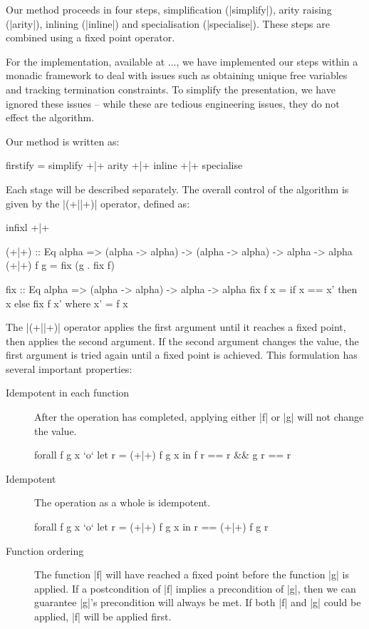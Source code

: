\documentclass[preprint]{sigplanconf}
\begin{document}
Our method proceeds in four steps, simplification (|simplify|), arity raising (|arity|), inlining (|inline|) and specialisation (|specialise|). These steps are combined using a fixed point operator.

For the implementation, available at ..., we have implemented our steps within a monadic framework to deal with issues such as obtaining unique free variables and tracking termination constraints. To simplify the presentation, we have ignored these issues -- while these are tedious engineering issues, they do not effect the algorithm.

Our method is written as:

\begin{code}
firstify = simplify +|+ arity +|+ inline +|+ specialise
\end{code}

Each stage will be described separately. The overall control of the algorithm is given by the |(+||+)| operator, defined as:

\begin{code}
infixl +|+

(+|+) :: Eq alpha => (alpha -> alpha) -> (alpha -> alpha) -> alpha -> alpha
(+|+) f g = fix (g . fix f)

fix :: Eq alpha => (alpha -> alpha) -> alpha -> alpha
fix f x = if x == x' then x else fix f x'
    where x' = f x
\end{code}

The |(+||+)| operator applies the first argument until it reaches a fixed point, then applies the second argument. If the second argument changes the value, the first argument is tried again until a fixed point is achieved. This formulation has several important properties:

\begin{description}
\item[Idempotent in each function] After the operation has completed, applying either |f| or |g| will not change the value.

\begin{code}
forall f g x `o` let r = (+|+) f g x in f r == r && g r == r
\end{code}

\item[Idempotent] The operation as a whole is idempotent.

\begin{code}
forall f g x `o` let r = (+|+) f g x in r == (+|+) f g r
\end{code}

\item[Function ordering] The function |f| will have reached a fixed point before the function |g| is applied. If a postcondition of |f| implies a precondition of |g|, then we can guarantee |g|'s precondition will always be met. If both |f| and |g| could be applied, |f| will be applied first.
\end{description}
\end{document}
